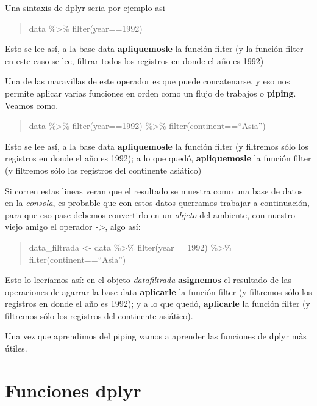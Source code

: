 \documentclass[
]{book}
\begin{document}
Una sintaxis de dplyr seria por ejemplo asi

\begin{quote}
data \%\textgreater\% filter(year==1992)
\end{quote}

Esto se lee así, a la base data \textbf{apliquemosle} la función filter (y la función filter en este caso se lee, filtrar todos los registros en donde el año es 1992)

Una de las maravillas de este operador es que puede concatenarse, y eso nos permite aplicar varias funciones en orden como un flujo de trabajos o \textbf{piping}. Veamos como.

\begin{quote}
data \%\textgreater\% filter(year==1992) \%\textgreater\% filter(continent==``Asia'')
\end{quote}

Esto se lee así, a la base data \textbf{apliquemosle} la función filter (y filtremos sólo los registros en donde el año es 1992); a lo que quedó, \textbf{apliquemosle} la función filter (y filtremos sólo los registros del continente asiático)

Si corren estas lineas veran que el resultado se muestra como una base de datos en la \emph{consola}, es probable que con estos datos querramos trabajar a continuación, para que eso pase debemos convertirlo en un \emph{objeto} del ambiente, con nuestro viejo amigo el operador \emph{-\textgreater{}}, algo así:

\begin{quote}
data\_filtrada \textless- data \%\textgreater\% filter(year==1992) \%\textgreater\% filter(continent==``Asia'')
\end{quote}

Esto lo leeríamos así: en el objeto \emph{datafiltrada} \textbf{asignemos} el resultado de las operaciones de agarrar la base data \textbf{aplicarle} la función filter (y filtremos sólo los registros en donde el año es 1992); y a lo que quedó, \textbf{aplicarle} la función filter (y filtremos sólo los registros del continente asiático).

Una vez que aprendimos del piping vamos a aprender las funciones de dplyr màs útiles.

\hypertarget{funciones-dplyr}{%
\section{Funciones dplyr}\label{funciones-dplyr}}
\end{document}

